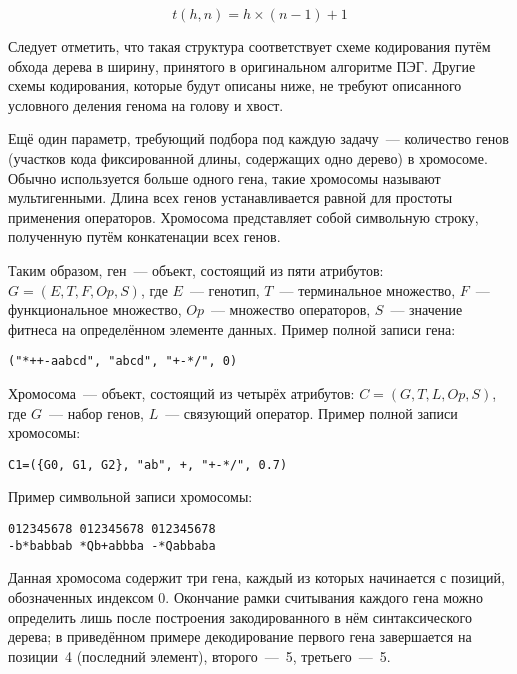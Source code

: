 \begin{equation}
\label{eq:GEP_tail_size}
t(h,n) = h \times (n -1) + 1
\end{equation}

Следует отметить, что такая структура соответствует схеме кодирования путём обхода дерева в ширину, принятого в оригинальном алгоритме ПЭГ. Другие схемы кодирования, которые будут описаны ниже, не требуют описанного условного деления генома на голову и хвост.

Ещё один параметр, требующий подбора под каждую задачу~--- количество генов (участков кода фиксированной длины, содержащих одно дерево) в хромосоме. Обычно используется больше одного гена, такие хромосомы называют мультигенными. Длина всех генов устанавливается равной для простоты применения операторов. Хромосома представляет собой символьную строку, полученную путём конкатенации всех генов.

Таким образом, ген~--- объект, состоящий из пяти атрибутов: $G = (E, T, F, Op, S)$, где $E$~--- генотип, $T$~--- терминальное множество, $F$~--- функциональное множество, $Op$~--- множество операторов, $S$~--- значение фитнеса на определённом элементе данных. Пример полной записи гена:

\begin{verbatim}
("*++-aabcd", "abcd", "+-*/", 0)
\end{verbatim}

Хромосома~--- объект, состоящий из четырёх атрибутов: $C = (G, T, L, Op, S)$, где $G$~--- набор генов, $L$~--- связующий оператор. Пример полной записи хромосомы:

\begin{verbatim}
C1=({G0, G1, G2}, "ab", +, "+-*/", 0.7)
\end{verbatim}

Пример символьной записи хромосомы:

\begin{samepage}
\begin{verbatim}
012345678 012345678 012345678
-b*babbab *Qb+abbba -*Qabbaba
\end{verbatim}
\end{samepage}

Данная хромосома содержит три гена, каждый из которых начинается с позиций, обозначенных индексом 0. Окончание рамки считывания каждого гена можно определить лишь после построения закодированного в нём синтаксического дерева; в приведённом примере декодирование первого гена завершается на позиции~4 (последний элемент), второго~---~5, третьего~---~5.

